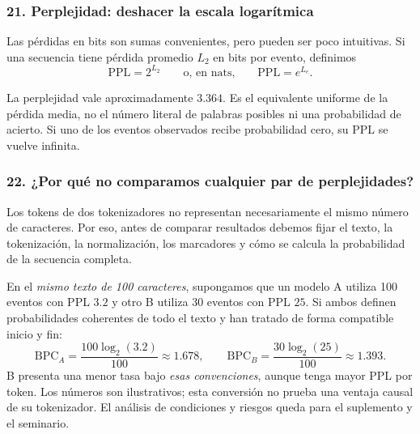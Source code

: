 \subsubsection*{21. Perplejidad: deshacer la escala logarítmica}
Las pérdidas en bits son sumas convenientes, pero pueden ser poco intuitivas. Si una secuencia tiene pérdida promedio $L_2$ en bits por evento, definimos
\[
\boxed{\mathrm{PPL}=2^{L_2}}\qquad \text{o, en nats,}\qquad \boxed{\mathrm{PPL}=e^{L_e}}.
\]
\begin{center}
\end{center}
La perplejidad vale aproximadamente $3.364$. Es el equivalente uniforme de la pérdida media, no el número literal de palabras posibles ni una probabilidad de acierto. Si uno de los eventos observados recibe probabilidad cero, su PPL se vuelve infinita.

\subsubsection*{22. ¿Por qué no comparamos cualquier par de perplejidades?}
Los tokens de dos tokenizadores no representan necesariamente el mismo número de caracteres. Por eso, antes de comparar resultados debemos fijar el texto, la tokenización, la normalización, los marcadores y cómo se calcula la probabilidad de la secuencia completa.
\begin{ejemplo}
En el \emph{mismo texto de 100 caracteres}, supongamos que un modelo A utiliza 100 eventos con PPL $3.2$ y otro B utiliza 30 eventos con PPL $25$. Si ambos definen probabilidades coherentes de todo el texto y han tratado de forma compatible inicio y fin:
\[
\mathrm{BPC}_A=\frac{100\log_2(3.2)}{100}\approx1.678,
\qquad
\mathrm{BPC}_B=\frac{30\log_2(25)}{100}\approx1.393.
\]
B presenta una menor tasa bajo \emph{esas convenciones}, aunque tenga mayor PPL por token. Los números son ilustrativos; esta conversión no prueba una ventaja causal de su tokenizador. El análisis de condiciones y riesgos queda para el suplemento y el seminario.
\end{ejemplo}

